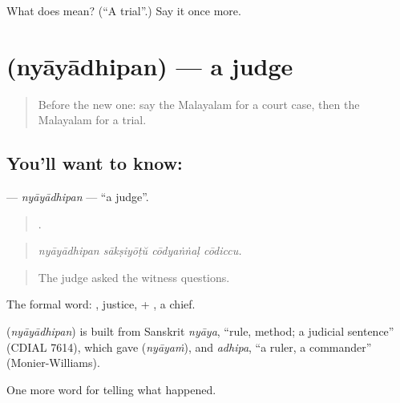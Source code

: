\begin{tcolorbox}[breakable,colback=teal!4,colframe=teal!35!black,title={Before you move on}]
What does  mean? (\textquotedblleft{}A trial\textquotedblright{}.) Say it once more.
\end{tcolorbox}
\section[\texorpdfstring{\ml{ന്യായാധിപൻ} (nyāyādhipan)}{ന്യായാധിപൻ (nyāyādhipan)}]{ (nyāyādhipan) — a judge}

\label{lesson:ML-C368-nyayadhipan}



\begin{quote}
Before the new one: say the Malayalam for a court case, then the Malayalam for a trial.
\end{quote}

\subsection*{You'll want to know: }
\textbf{} — \emph{nyāyādhipan} — \textquotedblleft{}a judge\textquotedblright{}.

\begin{quote}
   .
\end{quote}

\begin{quote}
\emph{nyāyādhipan sākṣiyōṭŭ cōdyaṅṅaḷ cōdiccu.}
\end{quote}

\begin{quote}
The judge asked the witness questions.
\end{quote}

The formal word: , justice, + , a chief.

\begin{cousinweb}
\textbf{} (\emph{nyāyādhipan}) is built from Sanskrit \emph{nyāya}, \textquotedblleft{}rule, method; a judicial sentence\textquotedblright{} (CDIAL 7614), which gave  (\emph{nyāyaṁ}), and \emph{adhipa}, \textquotedblleft{}a ruler, a commander\textquotedblright{} (Monier-Williams).
\end{cousinweb}

\begin{grammarlens}[title={What you've built}]
One more word for telling what happened.
\end{grammarlens}

